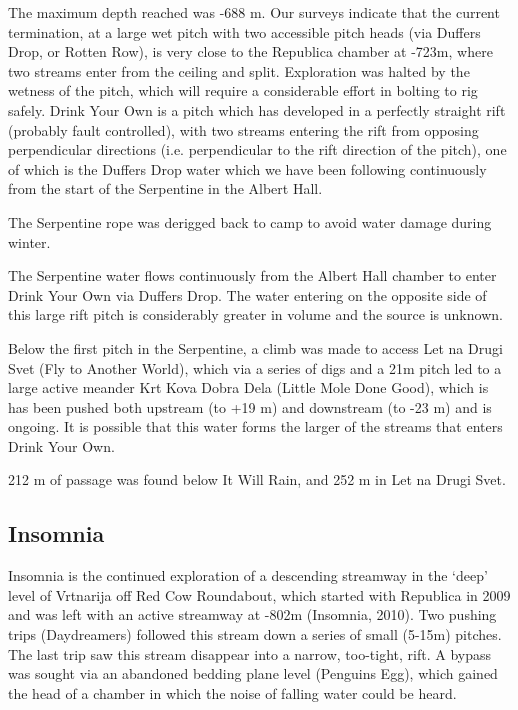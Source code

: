 The maximum depth reached was -688 m. Our surveys indicate that the
current termination, at a large wet pitch with two accessible pitch
heads (via Duffers Drop, or Rotten Row), is very close to the Republica
chamber at -723m, where two streams enter from the ceiling and split.
Exploration was halted by the wetness of the pitch, which will require a
considerable effort in bolting to rig safely. Drink Your Own is a pitch
which has developed in a perfectly straight rift (probably fault
controlled), with two streams entering the rift from opposing
perpendicular directions (i.e. perpendicular to the rift direction of
the pitch), one of which is the Duffers Drop water which we have been
following continuously from the start of the Serpentine in the Albert
Hall.

The Serpentine rope was derigged back to camp to avoid water damage
during winter.

The Serpentine water flows continuously from the Albert Hall chamber to
enter Drink Your Own via Duffers Drop. The water entering on the
opposite side of this large rift pitch is considerably greater in volume
and the source is unknown.

Below the first pitch in the Serpentine, a climb was made to access Let
na Drugi Svet (Fly to Another World), which via a series of digs and a
21m pitch led to a large active meander Krt Kova Dobra Dela (Little Mole
Done Good), which is has been pushed both upstream (to +19 m) and
downstream (to -23 m) and is ongoing. It is possible that this water
forms the larger of the streams that enters Drink Your Own.

212 m of passage was found below It Will Rain, and 252 m in Let na Drugi
Svet.

\hypertarget{insomnia}{%
\subsection{Insomnia}\label{insomnia}}

Insomnia is the continued exploration of a descending streamway in the
`deep' level of Vrtnarija off Red Cow Roundabout, which started with
Republica in 2009 and was left with an active streamway at -802m
(Insomnia, 2010). Two pushing trips (Daydreamers) followed this stream
down a series of small (5-15m) pitches. The last trip saw this stream
disappear into a narrow, too-tight, rift. A bypass was sought via an
abandoned bedding plane level (Penguins Egg), which gained the head of a
chamber in which the noise of falling water could be heard.

